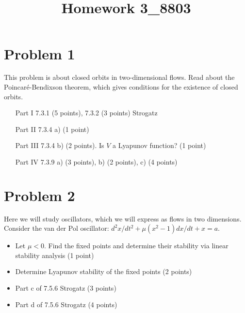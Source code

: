 \documentclass[12pt]{article}
\title{Homework 3_8803}
\begin{document}
\MakeScribeTop

\section*{Problem 1}

This problem is about closed orbits in two-dimensional flows. Read about the Poincar\'e-Bendixson theorem, which gives conditions for the existence of closed orbits.  
\begin{itemize}
	\item[Part I] 7.3.1 (5 points), 7.3.2 (3 points) Strogatz
	\item[Part II] 7.3.4 a) (1 point)
	\item[Part III] 7.3.4 b) (2 points). Is $V$ a Lyapunov function? (1 point)
	\item[Part IV] 7.3.9 a) (3 points), b) (2 points), c) (4 points)

\end{itemize}




\section*{Problem 2}
Here we will study oscillators, which we will express as flows in two dimensions.
Consider the van der Pol oscillator: $d^2 x/dt^2 + \mu(x^2 -1)dx/dt + x = a$.
\begin{itemize}
	\item Let $\mu < 0$. Find the fixed points and determine their stability via linear stability analysis (1 point)
	\item Determine Lyapunov stability of the fixed points (2 points)
	\item Part c of 7.5.6 Strogatz (3 points)
	\item Part d of 7.5.6 Strogatz (4 points)

\end{itemize}
\end{document}
